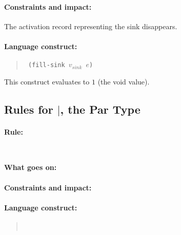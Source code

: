 \documentclass[a4paper]{article}
\begin{document}
\paragraph{Constraints and impact:} The activation record representing
the sink disappears.

\paragraph{Language construct:}
\begin{quote}\tt
  (fill-sink $v_{sink}$ $e$)
\end{quote}
This construct evaluates to $1$ (the void value).


\subsection{Rules for $|$, the Par Type}

\paragraph{Rule:}
$$
{
}\over{
}
$$
\paragraph{What goes on:}
\paragraph{Constraints and impact:}
\paragraph{Language construct:}
\begin{quote}\tt
\end{quote}




\end{document}
